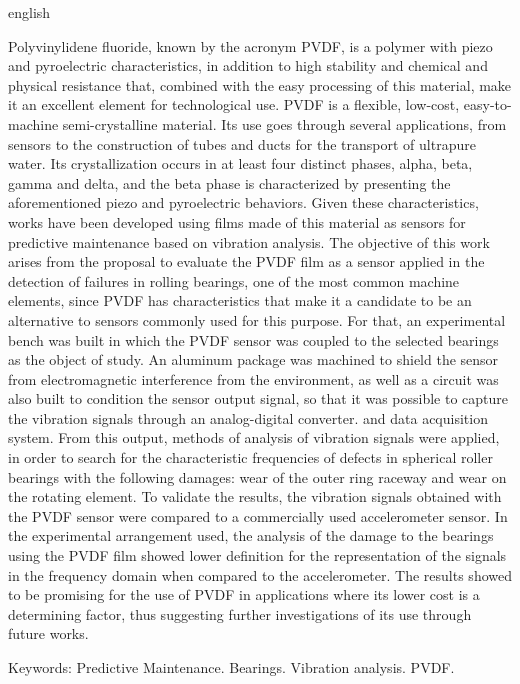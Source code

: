 \documentclass[
	12pt,				
	oneside,			
	a4paper,			
	english,			
	brazil,	
	sumario=abnt-6027-2012		
	]{abntex2ppgsi}
\begin{document}

\begin{resumo}[Abstract]
\begin{otherlanguage*}{english}

Polyvinylidene fluoride, known by the acronym PVDF, is a polymer with piezo and pyroelectric characteristics, in addition to high stability and chemical and physical resistance that, combined with the easy processing of this material, make it an excellent element for technological use. PVDF is a flexible, low-cost, easy-to-machine semi-crystalline material. Its use goes through several applications, from sensors to the construction of tubes and ducts for the transport of ultrapure water. Its crystallization occurs in at least four distinct phases, alpha, beta, gamma and delta, and the beta phase is characterized by presenting the aforementioned piezo and pyroelectric behaviors. Given these characteristics, works have been developed using films made of this material as sensors for predictive maintenance based on vibration analysis. The objective of this work arises from the proposal to evaluate the PVDF film as a sensor applied in the detection of failures in rolling bearings, one of the most common machine elements, since PVDF has characteristics that make it a candidate to be an alternative to sensors commonly used for this purpose. For that, an experimental bench was built in which the PVDF sensor was coupled to the selected bearings as the object of study. An aluminum package was machined to shield the sensor from electromagnetic interference from the environment, as well as a circuit was also built to condition the sensor output signal, so that it was possible to capture the vibration signals through an analog-digital converter. and data acquisition system. From this output, methods of analysis of vibration signals were applied, in order to search for the characteristic frequencies of defects in spherical roller bearings with the following damages: wear of the outer ring raceway and wear on the rotating element. To validate the results, the vibration signals obtained with the PVDF sensor were compared to a commercially used accelerometer sensor. In the experimental arrangement used, the analysis of the damage to the bearings using the PVDF film showed lower definition for the representation of the signals in the frequency domain when compared to the accelerometer. The results showed to be promising for the use of PVDF in applications where its lower cost is a determining factor, thus suggesting further investigations of its use through future works.


Keywords: Predictive Maintenance. Bearings. Vibration analysis. PVDF.
\end{otherlanguage*}
\end{resumo}
\end{document}
